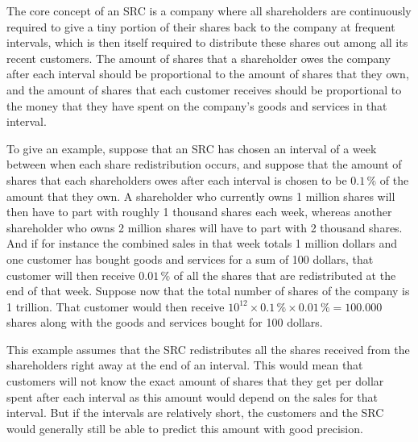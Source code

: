 \documentclass{article}
\begin{document}
The core concept of an SRC is a company where all shareholders are continuously required to give a tiny portion of their shares back to the company at frequent intervals, which is then itself required to distribute these shares out among all its recent customers. The amount of shares that a shareholder owes the company after each interval should be proportional to the amount of shares that they own, and the amount of shares that each customer receives should be proportional to the money that they have spent on the company's goods and services in that interval. 


To give an example, suppose that an SRC has chosen an interval of a week between when each share redistribution occurs, and suppose that the amount of shares that each shareholders owes after each interval is chosen to be $0.1\, \%$ of the amount that they own. A shareholder who currently owns 1 million shares will then have to part with roughly 1 thousand shares each week, whereas another shareholder who owns 2 million shares will have to part with 2 thousand shares. And if for instance the combined sales in that week totals 1 million dollars and one customer has bought goods and services for a sum of 100 dollars, that customer will then receive $0.01\,\%$ of all the shares that are redistributed at the end of that week. 
Suppose now that the total number of shares of the company is 1 trillion. That customer would then receive $10^{12} \times 0.1\,\% \times 0.01\,\% = 100.000$ shares along with the goods and services bought for 100 dollars. 

This example assumes that the SRC redistributes all the shares received from the shareholders right away at the end of an interval. This would mean that customers will not know the exact amount of shares that they get per dollar spent after each interval as this amount would depend on the sales for that interval. But if the intervals are relatively short, the customers and the SRC would generally still be able to predict this amount with good precision. 
\end{document}
